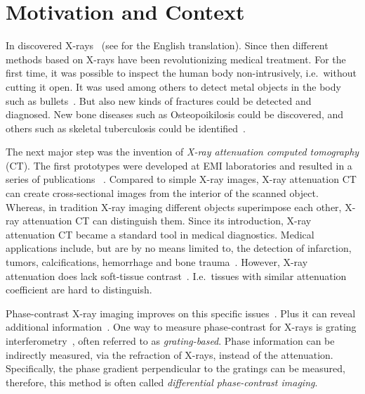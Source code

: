 \chapter{Motivation and Context}\label{chap:introduction}

In \citeyear{rontgen_uber_1895} \citeauthor{rontgen_uber_1895} discovered
X-rays~\cite{rontgen_uber_1895} (see \cite{rontgen_new_1896} for the English translation). Since
then different methods based on X-rays have been revolutionizing medical treatment. For the first
time, it was possible to inspect the human body non-intrusively, i.e.\ without cutting it open. It
was used among others to detect metal objects in the body such as
bullets~\cite{haygood_skeletal_1996}. But also new kinds of fractures could be detected and
diagnosed. New bone diseases such as Osteopoikilosis could be discovered, and others such as
skeletal tuberculosis could be identified~\cite{haygood_skeletal_1996}.

The next major step was the invention of \textit{X-ray attenuation computed tomography} (CT). The
first prototypes were developed at EMI laboratories and resulted in a series of publications
~\cite{hounsfield_computerized_1973,ambrose_computerized_1973,perry_computerized_1973}. Compared to
simple X-ray images, X-ray attenuation CT can create cross-sectional images from the interior of the
scanned object. Whereas, in tradition X-ray imaging different objects superimpose each other, X-ray
attenuation CT can distinguish them. Since its introduction, X-ray attenuation CT became a standard
tool in medical diagnostics. Medical applications include, but are by no means limited to, the
detection of infarction, tumors, calcifications, hemorrhage and bone
trauma~\cite[Chapter~5]{buchanan_advanced_2012}. However, X-ray attenuation does lack soft-tissue
contrast~\cite{pfeiffer_phase_2006}. I.e.\ tissues with similar attenuation coefficient are hard to
distinguish.

Phase-contrast X-ray imaging improves on this specific issues~\cite{lewis_medical_2004}. Plus it can
reveal additional information~\cite{hahn_numerical_2012}. One way to measure phase-contrast for
X-rays is grating interferometry~\cite{pfeiffer_hard-x-ray_2008}, often referred to as
\textit{grating-based}. Phase information can be indirectly measured, via the refraction of X-rays,
instead of the attenuation. Specifically, the phase gradient perpendicular to the gratings can be
measured, therefore, this method is often called \textit{differential phase-contrast imaging}.

